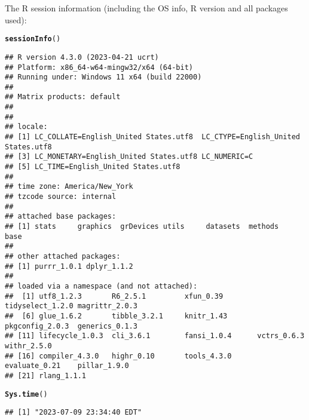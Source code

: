 \documentclass{article}\usepackage[]{graphicx}\usepackage[]{xcolor}
\makeatletter
\newcommand{\hlstd}[1]{\textcolor[rgb]{0.345,0.345,0.345}{#1}}%
\newcommand{\hlkwd}[1]{\textcolor[rgb]{0.737,0.353,0.396}{\textbf{#1}}}%
\newenvironment{kframe}{%
 \def\at@end@of@kframe{}%
 \ifinner\ifhmode%
  \def\at@end@of@kframe{\end{minipage}}%
  \begin{minipage}{\columnwidth}%
 \fi\fi%
 \def\FrameCommand##1{\hskip\@totalleftmargin \hskip-\fboxsep
 \colorbox{shadecolor}{##1}\hskip-\fboxsep
     \hskip-\linewidth \hskip-\@totalleftmargin \hskip\columnwidth}%
 \MakeFramed {\advance\hsize-\width
   \@totalleftmargin\z@ \linewidth\hsize
   \@setminipage}}%
 {\par\unskip\endMakeFramed%
 \at@end@of@kframe}
\newenvironment{knitrout}{}{} %
\makeatother
\begin{document}
The R session information (including the OS info, R version and all
packages used):

\begin{knitrout}
\color{fgcolor}\begin{kframe}
\begin{alltt}
\hlkwd{sessionInfo}\hlstd{()}
\end{alltt}
\begin{verbatim}
## R version 4.3.0 (2023-04-21 ucrt)
## Platform: x86_64-w64-mingw32/x64 (64-bit)
## Running under: Windows 11 x64 (build 22000)
## 
## Matrix products: default
## 
## 
## locale:
## [1] LC_COLLATE=English_United States.utf8  LC_CTYPE=English_United States.utf8   
## [3] LC_MONETARY=English_United States.utf8 LC_NUMERIC=C                          
## [5] LC_TIME=English_United States.utf8    
## 
## time zone: America/New_York
## tzcode source: internal
## 
## attached base packages:
## [1] stats     graphics  grDevices utils     datasets  methods   base     
## 
## other attached packages:
## [1] purrr_1.0.1 dplyr_1.1.2
## 
## loaded via a namespace (and not attached):
##  [1] utf8_1.2.3       R6_2.5.1         xfun_0.39        tidyselect_1.2.0 magrittr_2.0.3  
##  [6] glue_1.6.2       tibble_3.2.1     knitr_1.43       pkgconfig_2.0.3  generics_0.1.3  
## [11] lifecycle_1.0.3  cli_3.6.1        fansi_1.0.4      vctrs_0.6.3      withr_2.5.0     
## [16] compiler_4.3.0   highr_0.10       tools_4.3.0      evaluate_0.21    pillar_1.9.0    
## [21] rlang_1.1.1
\end{verbatim}
\begin{alltt}
\hlkwd{Sys.time}\hlstd{()}
\end{alltt}
\begin{verbatim}
## [1] "2023-07-09 23:34:40 EDT"
\end{verbatim}
\end{kframe}
\end{knitrout}
\end{document}
